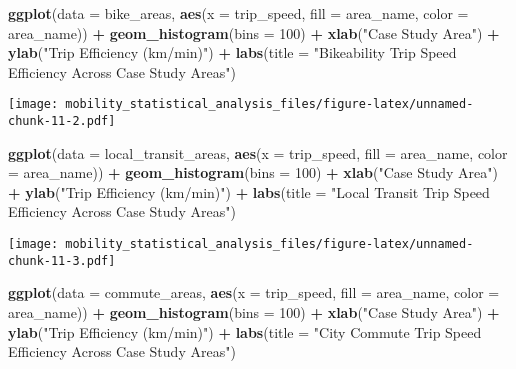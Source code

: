\documentclass[
]{article}
\newenvironment{Shaded}{\begin{snugshade}}{\end{snugshade}}
\newcommand{\AttributeTok}[1]{\textcolor[rgb]{0.13,0.29,0.53}{#1}}
\newcommand{\DecValTok}[1]{\textcolor[rgb]{0.00,0.00,0.81}{#1}}
\newcommand{\FunctionTok}[1]{\textcolor[rgb]{0.13,0.29,0.53}{\textbf{#1}}}
\newcommand{\NormalTok}[1]{#1}
\newcommand{\SpecialCharTok}[1]{\textcolor[rgb]{0.81,0.36,0.00}{\textbf{#1}}}
\newcommand{\StringTok}[1]{\textcolor[rgb]{0.31,0.60,0.02}{#1}}
\begin{document}
\begin{Shaded}
\begin{Highlighting}[]
\FunctionTok{ggplot}\NormalTok{(}\AttributeTok{data =}\NormalTok{ bike\_areas, }\FunctionTok{aes}\NormalTok{(}\AttributeTok{x =}\NormalTok{ trip\_speed, }\AttributeTok{fill =}\NormalTok{ area\_name, }\AttributeTok{color =}\NormalTok{ area\_name)) }\SpecialCharTok{+} 
  \FunctionTok{geom\_histogram}\NormalTok{(}\AttributeTok{bins =} \DecValTok{100}\NormalTok{) }\SpecialCharTok{+} 
  \FunctionTok{xlab}\NormalTok{(}\StringTok{"Case Study Area"}\NormalTok{) }\SpecialCharTok{+} 
  \FunctionTok{ylab}\NormalTok{(}\StringTok{"Trip Efficiency (km/min)"}\NormalTok{) }\SpecialCharTok{+} 
  \FunctionTok{labs}\NormalTok{(}\AttributeTok{title =} \StringTok{"Bikeability Trip Speed Efficiency Across Case Study Areas"}\NormalTok{) }
\end{Highlighting}
\end{Shaded}

\texttt{[image: mobility\_statistical\_analysis\_files/figure-latex/unnamed-chunk-11-2.pdf]}

\begin{Shaded}
\begin{Highlighting}[]
\FunctionTok{ggplot}\NormalTok{(}\AttributeTok{data =}\NormalTok{ local\_transit\_areas, }\FunctionTok{aes}\NormalTok{(}\AttributeTok{x =}\NormalTok{ trip\_speed, }\AttributeTok{fill =}\NormalTok{ area\_name, }\AttributeTok{color =}\NormalTok{ area\_name)) }\SpecialCharTok{+} 
  \FunctionTok{geom\_histogram}\NormalTok{(}\AttributeTok{bins =} \DecValTok{100}\NormalTok{) }\SpecialCharTok{+} 
  \FunctionTok{xlab}\NormalTok{(}\StringTok{"Case Study Area"}\NormalTok{) }\SpecialCharTok{+} 
  \FunctionTok{ylab}\NormalTok{(}\StringTok{"Trip Efficiency (km/min)"}\NormalTok{) }\SpecialCharTok{+} 
  \FunctionTok{labs}\NormalTok{(}\AttributeTok{title =} \StringTok{"Local Transit Trip Speed Efficiency Across Case Study Areas"}\NormalTok{) }
\end{Highlighting}
\end{Shaded}

\texttt{[image: mobility\_statistical\_analysis\_files/figure-latex/unnamed-chunk-11-3.pdf]}

\begin{Shaded}
\begin{Highlighting}[]
\FunctionTok{ggplot}\NormalTok{(}\AttributeTok{data =}\NormalTok{ commute\_areas, }\FunctionTok{aes}\NormalTok{(}\AttributeTok{x =}\NormalTok{ trip\_speed, }\AttributeTok{fill =}\NormalTok{ area\_name, }\AttributeTok{color =}\NormalTok{ area\_name)) }\SpecialCharTok{+} 
  \FunctionTok{geom\_histogram}\NormalTok{(}\AttributeTok{bins =} \DecValTok{100}\NormalTok{) }\SpecialCharTok{+} 
  \FunctionTok{xlab}\NormalTok{(}\StringTok{"Case Study Area"}\NormalTok{) }\SpecialCharTok{+} 
  \FunctionTok{ylab}\NormalTok{(}\StringTok{"Trip Efficiency (km/min)"}\NormalTok{) }\SpecialCharTok{+} 
  \FunctionTok{labs}\NormalTok{(}\AttributeTok{title =} \StringTok{"City Commute Trip Speed Efficiency Across Case Study Areas"}\NormalTok{) }
\end{Highlighting}
\end{Shaded}
\end{document}
